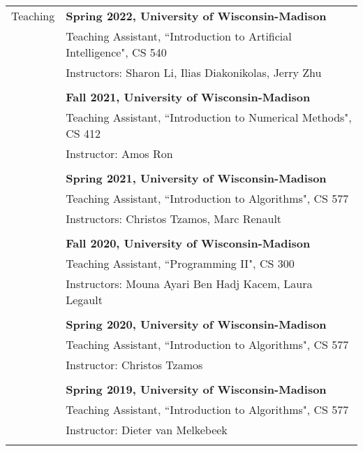 \documentclass[letterpaper,11pt,oneside]{article}
\begin{document}
\begin{longtable}{@{} l l}

  \Large{Teaching}

  & \textbf{Spring 2022, University of Wisconsin-Madison} \\
  & Teaching Assistant, ``Introduction to Artificial Intelligence", CS 540\\
  & Instructors: Sharon Li, Ilias Diakonikolas, Jerry Zhu \\
  & \\

  & \textbf{Fall 2021, University of Wisconsin-Madison} \\
  & Teaching Assistant, ``Introduction to Numerical Methods", CS 412\\
  & Instructor: Amos Ron\\
  & \\

  & \textbf{Spring 2021, University of Wisconsin-Madison} \\
  & Teaching Assistant, ``Introduction to Algorithms", CS 577 \\
  & Instructors: Christos Tzamos, Marc Renault \\
  & \\

  & \textbf{Fall 2020, University of Wisconsin-Madison} \\
  & Teaching Assistant, ``Programming II", CS 300 \\
  & Instructors: Mouna Ayari Ben Hadj Kacem, Laura Legault \\
  & \\

  & \textbf{Spring 2020, University of Wisconsin-Madison} \\
  & Teaching Assistant, ``Introduction to Algorithms", CS 577 \\
  & Instructor: Christos Tzamos \\
  & \\

& \textbf{Spring 2019, University of Wisconsin-Madison} \\
& Teaching Assistant, ``Introduction to Algorithms", CS 577 \\
& Instructor: Dieter van Melkebeek \\
& \\


\end{longtable}
\end{document}
